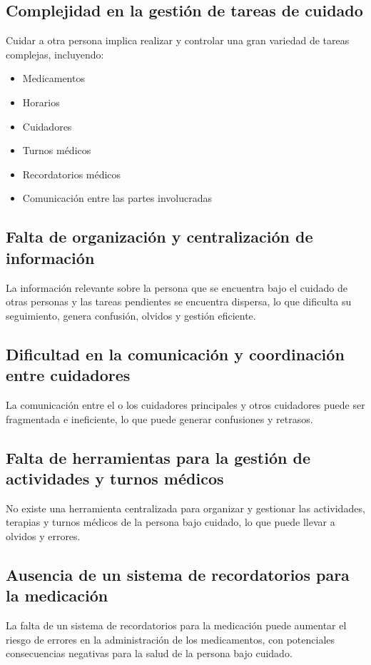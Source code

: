 \documentclass[a4paper,12pt]{article}
\begin{document}
    \subsection{Complejidad en la gestión de tareas de cuidado}
    Cuidar a otra persona implica realizar y controlar una gran variedad de tareas complejas, incluyendo:
    \begin{itemize}
        \item Medicamentos
        \item Horarios
        \item Cuidadores
        \item Turnos médicos
        \item Recordatorios médicos
        \item Comunicación entre las partes involucradas
    \end{itemize}
    \subsection{Falta de organización y centralización de información}
    La información relevante sobre la persona que se encuentra bajo el cuidado de otras personas y las tareas pendientes se encuentra dispersa, lo que dificulta su seguimiento, genera confusión, olvidos y gestión eficiente.
    \subsection{Dificultad en la comunicación y coordinación entre cuidadores}
    La comunicación entre el o los cuidadores principales y otros cuidadores puede ser fragmentada e ineficiente, lo que puede generar confusiones y retrasos.
    \subsection{Falta de herramientas para la gestión de actividades y turnos médicos}
    No existe una herramienta centralizada para organizar y gestionar las actividades, terapias y turnos médicos de la persona bajo cuidado, lo que puede llevar a olvidos y errores.
    \subsection{Ausencia de un sistema de recordatorios para la medicación}
    La falta de un sistema de recordatorios para la medicación puede aumentar el riesgo de errores en la administración de los medicamentos, con potenciales consecuencias negativas para la salud de la persona bajo cuidado.
\end{document}
